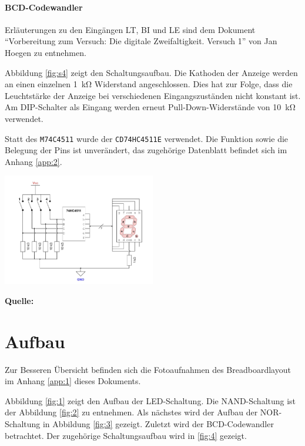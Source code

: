 \documentclass[
    paper=a4,
]{scrartcl}
\newcommand{\figsource}[1]{\par\footnotesize\textbf{Quelle:} #1\par}
\begin{document}
    \paragraph{BCD-Codewandler}
        Erläuterungen zu den Eingängen LT, BI und LE sind dem Dokument "`Vorbereitung zum Versuch: Die digitale Zweifaltigkeit. Versuch 1"' von Jan Hoegen zu entnehmen. 
        
        Abbildung \ref{fig:s4} zeigt den Schaltungsaufbau.
        Die Kathoden der Anzeige werden an einen einzelnen \SI{1}{\kilo\ohm} Widerstand angeschlossen. Dies hat zur Folge, dass die Leuchtstärke der Anzeige bei verschiedenen Eingangszuständen nicht konstant ist. Am DIP-Schalter als Eingang werden erneut Pull-Down-Widerstände von \SI{10}{\kilo\ohm} verwendet.

        Statt des \texttt{M74C4511} wurde der \texttt{CD74HC4511E} verwendet. Die Funktion sowie die Belegung der Pins ist unverändert, das zugehörige Datenblatt \cite{datenblatt} befindet sich im Anhang \ref{app:2}.%

        \begin{center}
            \includegraphics[width=0.5\textwidth]{Anhang/Schaltung4.png}
            \figsource{\cite{bauer}}
            \label{fig:s4}
        \end{center}

\section{Aufbau}
    \label{sec:1}
    Zur Besseren Übersicht befinden sich die Fotoaufnahmen des Breadboardlayout im Anhang \ref{app:1} dieses Dokuments.

    Abbildung \ref{fig:1} zeigt den Aufbau der LED-Schaltung. Die NAND-Schaltung ist der Abbildung \ref{fig:2} zu entnehmen. Als nächstes wird der Aufbau der NOR-Schaltung in Abbildung \ref{fig:3} gezeigt. Zuletzt wird der BCD-Codewandler betrachtet. Der zugehörige Schaltungsaufbau wird in \ref{fig:4} gezeigt. 
\end{document}
